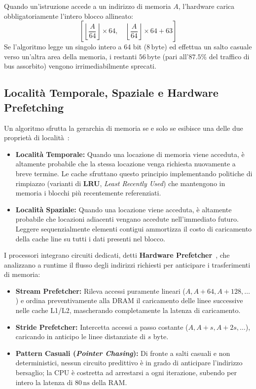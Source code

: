 Quando un'istruzione accede a un indirizzo di memoria $A$, l'hardware carica obbligatoriamente l'intero blocco allineato:
\begin{equation}
\left[\left\lfloor \frac{A}{64} \right\rfloor \times 64, \quad \left\lfloor \frac{A}{64} \right\rfloor \times 64 + 63\right]
\end{equation}
Se l'algoritmo legge un singolo intero a 64 bit ($8\,\text{byte}$) ed effettua un salto casuale verso un'altra area della memoria, i restanti $56\,\text{byte}$ (pari all'$87.5\%$ del traffico di bus assorbito) vengono irrimediabilmente sprecati.

\FloatBarrier
\subsection{Localit\`a Temporale, Spaziale e Hardware Prefetching}
\label{subsec:localita-prefetching}

Un algoritmo sfrutta la gerarchia di memoria se e solo se esibisce una delle due propriet\`a di localit\`a~\cite{bakhvalov2024}:
\begin{itemize}
    \item \textbf{Localit\`a Temporale:} Quando una locazione di memoria viene acceduta, \`e altamente probabile che la stessa locazione venga richiesta nuovamente a breve termine. Le cache sfruttano questo principio implementando politiche di rimpiazzo (varianti di \textbf{LRU}, \textit{Least Recently Used}) che mantengono in memoria i blocchi pi\`u recentemente referenziati.
    \item \textbf{Localit\`a Spaziale:} Quando una locazione viene acceduta, \`e altamente probabile che locazioni adiacenti vengano accedute nell'immediato futuro. Leggere sequenzialmente elementi contigui ammortizza il costo di caricamento della cache line su tutti i dati presenti nel blocco.
\end{itemize}

I processori integrano circuiti dedicati, detti \textbf{Hardware Prefetcher}~\cite{bakhvalov2024,slotin2023}, che analizzano a runtime il flusso degli indirizzi richiesti per anticipare i trasferimenti di memoria:
\begin{itemize}
    \item \textbf{Stream Prefetcher:} Rileva accessi puramente lineari ($A, A+64, A+128, \dots$) e ordina preventivamente alla DRAM il caricamento delle linee successive nelle cache L1/L2, mascherando completamente la latenza di caricamento.
    \item \textbf{Stride Prefetcher:} Intercetta accessi a passo costante ($A, A+s, A+2s, \dots$), caricando in anticipo le linee distanziate di $s$ byte.
    \item \textbf{Pattern Casuali (\textit{Pointer Chasing}):} Di fronte a salti casuali e non deterministici, nessun circuito predittivo \`e in grado di anticipare l'indirizzo bersaglio; la CPU \`e costretta ad arrestarsi a ogni iterazione, subendo per intero la latenza di $80\,\text{ns}$ della RAM.
\end{itemize}

